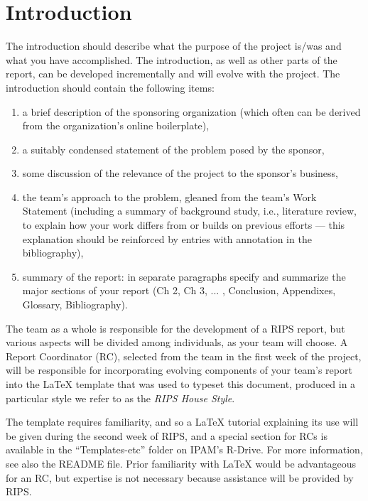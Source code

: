 \chapter{Introduction}\label{Ch:Introduction}

The introduction should describe what the purpose of the project is/was and what you have accomplished.
The introduction, as well as other parts of the report, can be developed incrementally and will evolve with the project.
The introduction should contain the following items:
\begin{enumerate}{}
\item a brief description of the sponsoring organization (which often can be derived from the organization's online boilerplate), 
\item a suitably condensed statement of the problem posed by the sponsor, 
\item some discussion of the relevance of the project to the sponsor's business, 
\item the team's approach to the problem, gleaned from the team's Work Statement (including a summary of background study, i.e., literature review, to explain how your work differs from or builds on previous efforts --- this explanation should be reinforced by entries with annotation in the bibliography),
\item summary of the report: in separate paragraphs specify and summarize the major sections of your report (Ch 2, Ch 3, ... , Conclusion,  Appendixes, Glossary, Bibliography).
\end{enumerate}

The team as a whole is responsible for the development of a RIPS report, but various aspects will be divided among individuals, as your team will choose.
A Report Coordinator (RC), selected from the team in the first week of the project, will be responsible for incorporating evolving components of your team's report into the {\LaTeX} template that was used to typeset this document, produced in a particular style we refer to as the {\it RIPS  House Style}.

The template requires familiarity, and so a {\LaTeX} tutorial explaining its use  will be given during the second week of RIPS, and a special section for RCs is available in the ``Templates-etc'' folder on IPAM's R-Drive.
For more information, see  also the  README file.
Prior familiarity with {\LaTeX}  would be advantageous for an RC, but expertise is not necessary because assistance will be provided by RIPS.


\endinput
